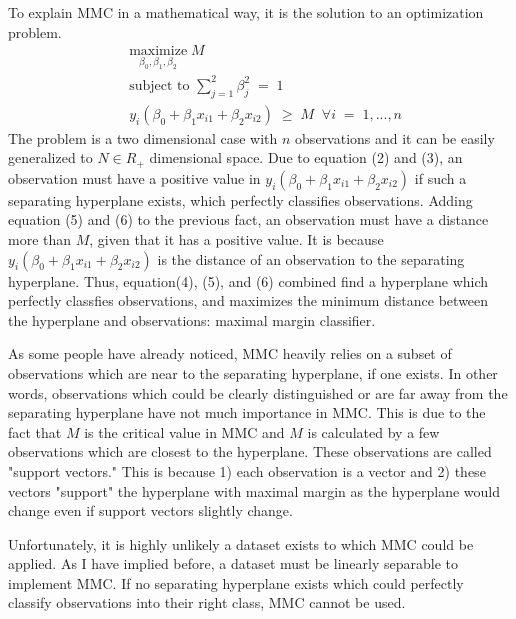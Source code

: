\documentclass[11pt,a4paper,oneside]{article}
\begin{document}
\par
To explain MMC in a mathematical way, it is the solution to an optimization problem.
\begin{align}
	&\underset{\beta_{0}, \beta_{1}, \beta_{2}}{\text{maximize}}\; M\\
	&\text{subject to }\sum^{2}_{j=1}\beta^{2}_{j}\;=\;1\\
	&y_{i}(\beta_{0}+\beta_{1}x_{i1}+\beta_{2}x_{i2}) \; \geq\; M\;\; \forall i\; =\; 1,...,n
\end{align}
The problem is a two dimensional case with $n$ observations and it can be easily generalized to $N\in R_{+}$ dimensional space. Due to equation (2) and (3), an observation must have a positive value in $y_{i}(\beta_{0}+\beta_{1}x_{i1}+\beta_{2}x_{i2})$ if such a separating hyperplane exists, which perfectly classifies observations. Adding equation (5) and (6) to the previous fact, an observation must have a distance more than $M$, given that it has a positive value. It is because $y_{i}(\beta_{0}+\beta_{1}x_{i1}+\beta_{2}x_{i2})$ is the distance of an observation to the separating hyperplane. Thus, equation(4), (5), and (6) combined find a hyperplane which perfectly classfies observations, and maximizes the minimum distance between the hyperplane and observations: maximal margin classifier.
\par
As some people have already noticed, MMC heavily relies on a subset of observations which are near to the separating hyperplane, if one exists. In other words, observations which could be clearly distinguished or are far away from the separating hyperplane have not much importance in MMC. This is due to the fact that $M$ is the critical value in MMC and $M$ is calculated by a few observations which are closest to the hyperplane. These observations are called "support vectors." This is because 1) each observation is a vector and 2) these vectors "support" the hyperplane with maximal margin as the hyperplane would change even if support vectors slightly change. 
\par
Unfortunately, it is highly unlikely a dataset exists to which MMC could be applied. As I have implied before, a dataset must be linearly separable to implement MMC. If no separating hyperplane exists which could perfectly classify observations into their right class, MMC cannot be used.
\end{document}
